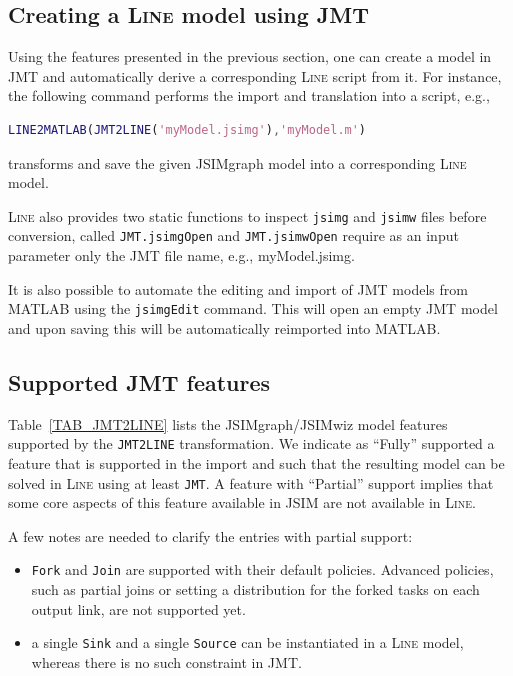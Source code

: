 \begin{MATLAB}
\subsection{Creating a \textsc{Line} model using JMT}
Using the features presented in the previous section, one can create a model in JMT and automatically derive a corresponding \textsc{Line} script from it. For instance, the following command performs the import and translation into a script, e.g.,
\begin{lstlisting}[language = matlab]
LINE2MATLAB(JMT2LINE('myModel.jsimg'),'myModel.m')
\end{lstlisting}
transforms and save the given JSIMgraph model into a corresponding \textsc{Line} model.

\textsc{Line} also provides two static functions to inspect \texttt{jsimg} and \texttt{jsimw} files before conversion, called
\texttt{JMT.jsimgOpen} and \texttt{JMT.jsimwOpen} require as an input parameter only the JMT file name, e.g., myModel.jsimg.

It is also possible to automate the editing and import of JMT models from MATLAB using the \texttt{jsimgEdit} command. This will open an empty JMT model and upon saving this will be automatically reimported into MATLAB.
\end{MATLAB}
\begin{JAVA}
\end{JAVA}
\begin{KOTLIN}
\end{KOTLIN}
\begin{PYTHON}
\end{PYTHON}

\subsection{Supported JMT features}
Table~\ref{TAB_JMT2LINE} lists the JSIMgraph/JSIMwiz model features supported by the \texttt{JMT2LINE} transformation. We indicate as ``Fully'' supported a feature that is supported in the import and such that the resulting model can be solved in \textsc{Line} using at least \texttt{JMT}. A feature with ``Partial'' support implies that some core aspects of this feature available in JSIM are not available in \textsc{Line}.

A few notes are needed to clarify the entries with partial support:
\begin{itemize}
\item \texttt{Fork} and \texttt{Join} are supported with their default policies. Advanced policies, such as partial joins or setting a distribution for the forked tasks on each output link, are not supported yet.
\item a single \texttt{Sink} and a single \texttt{Source} can be instantiated in a \textsc{Line} model, whereas there is no such constraint in JMT.
\end{itemize}

